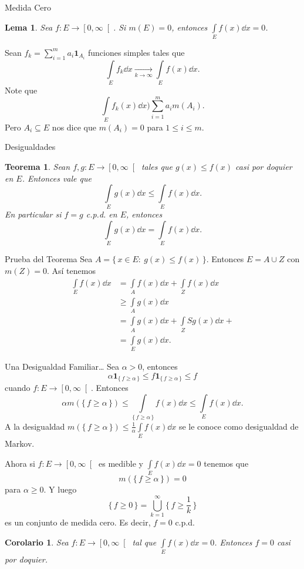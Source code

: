 \documentclass[utf8]{beamer}
\theoremstyle{plain}
\newtheorem{Th}{Teorema}               %
\newtheorem{Lem}{Lema}                 %
\newtheorem{Cor}{Corolario}            %
\theoremstyle{definition}
\theoremstyle{remark}
\numberwithin{equation}{section}
\newcommand{\al}{\alpha}                %
\newcommand{\lbonj}[1]{\left\lbrack#1\right\lbrack}
\newcommand{\set}[1]{\{\,#1\,\}}    %
\renewcommand{\geq}{\geqslant}          %
\renewcommand{\leq}{\leqslant}          %
\newcommand{\ind}{\mathbf{1}}       %
\newcommand{\suck}{_{k=1}^\infty} %
\renewcommand{\.}{\Cdot}                %
\begin{document}
\begin{frame}{Medida Cero}
  \begin{Lem}\label{lem:intSobreMedCero}
  Sea $f:E\to\lbonj{0,\infty}$. Si $m(E)=0$, entonces $\int\limits_Ef(x)\dd x=0$.
  \end{Lem}
Sean $f_k=\sum_{i=1}^ma_i\ind_{A_i}$ funciones simples tales que 
$$\int\limits_Ef_k\dd x\xrightarrow[k\to\infty]{}\int\limits_Ef(x)\dd x.$$
Note que 
$$\int\limits_Ef_k(x)\dd x)\sum_{i=1}^ma_im(A_i).$$
Pero $A_i\subseteq E$ nos dice que $m(A_i)=0$ para $1\leq i\leq m$.
\end{frame}

\begin{frame}{Desigualdades}
  \begin{Th}\label{th:intPreservaOrden}
    Sean $f,g:E\to\lbonj{0,\infty}$ tales que $g(x)\leq f(x)$ casi por doquier en $E$. Entonces vale que 
    $$\int\limits_Eg(x)\dd x\leq\int\limits_Ef(x)\dd x.$$
    En particular si $f=g$ c.p.d. en $E$, entonces
    $$\int\limits_Eg(x)\dd x=\int\limits_Ef(x)\dd x.$$
  \end{Th}
\end{frame}

\begin{frame}{Prueba del Teorema}
  Sea $A=\set{x\in E:\ g(x)\leq f(x)}$. Entonces $E=A\cup Z$ con $m(Z)=0$. Así tenemos
  \begin{align*}
    \int\limits_Ef(x)\dd x&=\int\limits_Af(x)\dd x+\int\limits_Zf(x)\dd x\\
    &\geq \int\limits_Ag(x)\dd x\\
    &= \int\limits_Ag(x)\dd x+\int\limits_ZSg(x)\dd x+\\
&=\int\limits_Eg(x)\dd x.
  \end{align*}
\end{frame}

\begin{frame}{Una Desigualdad Familiar\dots}\label{Markov}
  Sea $\al> 0$, entonces
  $$\al\ind_{\set{f\geq \al}}\leq f\ind_{\set{f\geq \al}}\leq f$$
  cuando $f:E\to\lbonj{0,\infty}$. Entonces
  $$\al m(\set{f\geq \al})\leq\int\limits_{\set{f\geq \al}}f(x)\dd x\leq \int\limits_Ef(x)\dd x.$$
  A la desigualdad $ m(\set{f\geq \al})\leq\frac{1}{\al}\int\limits_Ef(x)\dd x$ se le conoce como \alert{desigualdad de Markov}.
\end{frame}

\begin{frame}
  Ahora si $f:E\to\lbonj{0,\infty}$ es medible y $\int\limits_Ef(x)\dd x=0$ tenemos que 
  $$m(\set{f\geq \al})=0$$
  para $\al\geq 0$. Y luego 
  $$\set{f\geq 0}=\bigcup\suck\set{f\geq\frac{1}{k}}$$
  es un conjunto de medida cero. Es decir, $f=0$ c.p.d.
  \begin{Cor}\label{cor:aMarkov}
    Sea $f:E\to\lbonj{0,\infty}$ tal que $\int\limits_E f(x)\dd x=0$. Entonces $f=0$ casi por doquier.
  \end{Cor}
\end{frame}
\end{document}
